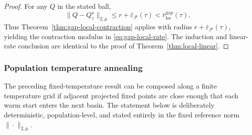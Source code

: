 \documentclass{article}
\theoremstyle{plain}
\theoremstyle{definition}
\theoremstyle{remark}
\begin{document}
\begin{proof}
For any $Q$ in the stated ball,
\[
\|Q-Q^\star_\tau\|_{2,\bar\mu}
\le
r+\bar\varepsilon_{\mathcal F}(\tau)
<
\bar r_{\mathrm{loc}}^{\mathrm{gap}}(\tau).
\]
Thus Theorem~\ref{thm:gap-local-contraction} applies with radius
$r+\bar\varepsilon_{\mathcal F}(\tau)$, yielding the contraction modulus in
\eqref{eq:gap-local-rate}. The induction and linear-rate conclusion are
identical to the proof of Theorem~\ref{thm:local-linear}.
\end{proof}

\subsubsection{Population temperature annealing}

The preceding fixed-temperature result can be composed along a finite
temperature grid if adjacent projected fixed points are close enough that each
warm start enters the next basin.  The statement below is deliberately
deterministic, population-level, and stated entirely in the fixed reference norm
$\|\cdot\|_{2,\bar\mu}$.
\end{document}
